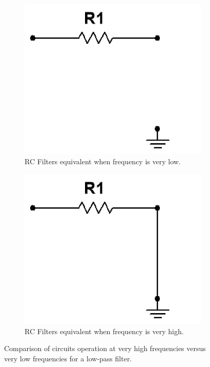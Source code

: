 \documentclass[12pt]{article}
\begin{document}
\begin{figure}[H]
\begin{subfigure}{.5\textwidth}
    \centering
    \includegraphics[width=0.8\linewidth]{photos/lab/open.png}
    \caption{RC Filters equivalent when frequency is very low.}
\end{subfigure}%
\begin{subfigure}{.5\textwidth}
  \centering
  \includegraphics[width=0.79\linewidth]{photos/lab/short.png}
  \caption{RC Filters equivalent when frequency is very high.}
\end{subfigure}
\caption{Comparison of circuits operation at very high frequencies versus very low frequencies for a low-pass filter.}
\end{figure}
\end{document}
